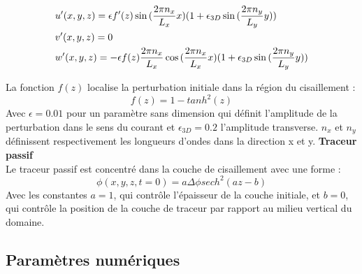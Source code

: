 \documentclass[a4paper,12pt]{article}
\begin{document}
    \begin{subequation}
        \begin{align}
        \displaystyle
            \label{u'_ini}
            & u'(x,y,z)=\epsilon f'(z)\sin{(\frac{2\pi n_x}{L_x}x)}(1+\epsilon_{3D}\sin{(\frac{2\pi n_y}{L_y}y)}) \\
            \label{v'_ini}
            & v'(x,y,z)=0 \\
            \label{w'_ini}
            & w'(x,y,z)=-\epsilon f(z)\frac{2\pi n_x}{L_x}\cos{(\frac{2\pi n_x}{L_x}x)}(1+\epsilon_{3D}\sin{(\frac{2\pi n_y}{L_y}y)})
        \end{align}
    \end{subequation}
    La fonction $f(z)$ localise la perturbation initiale dans la région du cisaillement : 
    \begin{equation}
        f(z)=1-tanh^2(z)
    \end{equation}
    Avec $\epsilon=0.01$ pour un paramètre sans dimension qui définit l'amplitude de la perturbation dans le sens du courant et $\epsilon_{3D}=0.2$ l'amplitude transverse. $n_x$ et $n_y$ définissent respectivement les longueurs d'ondes dans la direction x et y. 
    \newline
    \textbf{Traceur passif} \\
    Le traceur passif est concentré dans la couche de cisaillement avec une forme :
    \begin{equation}
    \label{phi_ini}
        \phi(x,y,z,t=0)= a\Delta\phi sech^2(az-b)
    \end{equation}
    Avec les constantes $a=1$, qui contrôle l'épaisseur de la couche initiale, et $b=0$, qui contrôle la position de la couche de traceur par rapport au milieu vertical du domaine. 
    
    \subsection{Paramètres numériques}
    
\end{document}

